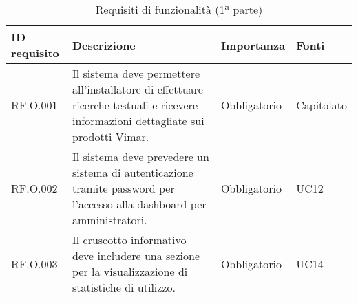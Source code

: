 \begin{table}[H]
\centering
    \begin{tabular}{|C{2.7cm}|L{7.2cm}|C{2.7cm}|C{2cm}|}
        \hline
        \textbf{ID requisito} & \textbf{Descrizione} & \textbf{Importanza} & \textbf{Fonti}  \\
        \hline
        RF.O.001 & Il sistema deve permettere all'installatore di effettuare ricerche testuali e ricevere informazioni dettagliate sui prodotti Vimar. & Obbligatorio & Capitolato \\
        \hline
        RF.O.002 & Il sistema deve prevedere un sistema di autenticazione tramite password per l'accesso alla dashboard per amministratori. & Obbligatorio & UC12 \\
        \hline
        RF.O.003 & Il cruscotto informativo deve includere una sezione per la visualizzazione di statistiche di utilizzo. & Obbligatorio & UC14 \\
        \hline
    \end{tabular}
    \caption{Requisiti di funzionalità (1\textsuperscript{a}  parte)}
\end{table}
